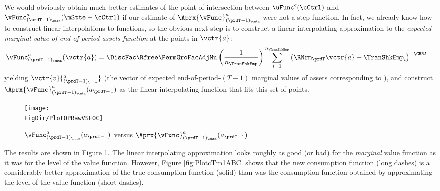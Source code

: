\documentclass[\econtexRoot/SolvingMicroDSOPs]{subfiles}
\begin{document}
We would obviously obtain much better estimates of the point of intersection between $\uFunc^{{c}}(\cCtrl)$ and $\vFunc_{({\prdT-1})_\cntn}^{{a}}(\mStte-\cCtrl)$ if our estimate of $\Aprx{\vFunc}^{{a}}_{({\prdT-1})_\cntn}$ were not a step function.  In fact, we already know how to construct linear interpolations to functions, so the obvious next step is to construct a linear interpolating approximation to the \textit{expected marginal value of end-of-period assets function} at the points in $\vctr{a}$:
\begin{equation}\begin{gathered}\begin{aligned}
      \vFunc_{({\prdT-1})_\cntn}^{{a}}(\vctr{a})  & =  \DiscFac \Rfree \PermGroFacAdjMu \left(\frac{1}{n_{\TranShkEmp}}\right) \sum_{i=1}^{n_{\TranShkEmp}} \left(\RNrm_{\prdT} \vctr{a} + \TranShkEmp_{i}\right)^{-\CRRA} \label{eq:vEndPrimeTm1}
    \end{aligned}\end{gathered}\end{equation}
yielding $\vctr{{v}}{^{a}_{({\prdT-1})_\cntn}}$ (the vector of expected end-of-period-$(T-1)$ marginal values of assets corresponding to ),  %
and construct
$\Aprx{\vFunc}_{({\prdT-1})_\cntn}^{{a}}({a}_{\prdT-1})$ as the linear
interpolating function that fits this set of points.

\hypertarget{PlotOPRawVSFOC}{}
\begin{figure}
  \centerline{\texttt{[image: \\FigDir/PlotOPRawVSFOC]}}
  \caption{$\vFunc_{({\prdT-1})_\cntn}^{{a}}({a}_{\prdT-1})$ versus $\Aprx{\vFunc}_{({\prdT-1})_\cntn}^{{a}}({a}_{\prdT-1})$}
  \label{fig:PlotOPRawVSFOC}
\end{figure}



The results are shown in Figure \ref{fig:PlotOPRawVSFOC}.  The linear interpolating approximation looks roughly as good (or bad) for the \textit{marginal} value function as it was for the level of the value function. However, Figure \ref{fig:PlotcTm1ABC} shows that the new consumption function (long dashes) is a considerably better approximation of the true consumption function (solid) than was the consumption function obtained by approximating the level of the value function (short dashes).
\end{document}
